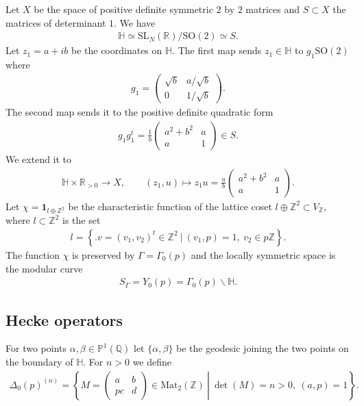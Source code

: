 \documentclass[a4paper,11pt]{amsart} %
\newcommand{\8}{\infty}
\newcommand{\Z}{\mathbb{Z}}
\newcommand{\id}{\mathbf{1}}
\newcommand{\SO}{\mathrm{SO}}
\newcommand{\SL}{\mathrm{SL}}
\newcommand{\HH}{\mathbb{H}}
\newcommand{\R}{\mathbb{R}}
\newcommand{\Q}{\mathbb{Q}}
\newcommand{\PP}{\mathbb{P}}
\newcommand{\Mat}{\mathrm{Mat}}
\theoremstyle{mytheoremstyle}
\theoremstyle{remark}
\numberwithin{equation}{section}
\begin{document}
 Let $X$ be the space of positive definite symmetric $2$ by $2$ matrices and $S \subset X$ the matrices of determinant $1$. We have
 \begin{align}
     \HH \simeq \SL_N(\R)/\SO(2) \simeq S.
 \end{align}
 Let $z_1=a+ib$ be the coordinates on $\HH$. The first map sends $z_1 \in \HH$ to $g_1\SO(2)$ where
 \begin{align}
     g_1=\begin{pmatrix}
         \sqrt{b} & a/\sqrt{b} \\
         0 & 1/\sqrt{b}
     \end{pmatrix}.
 \end{align}
 The second map sends it to the positive definite quadratic form
 \begin{align}
         g_1 g^t_1=\frac{1}{b} \begin{pmatrix}
             a^2+b^2 & a \\ a & 1
         \end{pmatrix} \in S.
 \end{align}
 We extend it to
 \begin{align}
     \HH \times \R_{>0} \longrightarrow X,\qquad
     (z_1 , u) \longmapsto z_1u=\frac{u}{b} \begin{pmatrix}
             a^2+b^2 & a \\ a & 1
         \end{pmatrix}.
 \end{align}
Let $\chi=\id_{l \oplus \Z^2}$ be the characteristic function of the lattice coset $l \oplus \Z^2 \subset V_\Z$, where $l \subset \Z^2$ is the set
\begin{align*}
l=\left \{ \biggl . v=(v_1,v_2)^t \in \Z^2 \  \biggr \vert \ (v_1,p)=1, \ v_2 \in p\Z  \right \}.
\end{align*}
The function $\chi$ is preserved by $\Gamma=\Gamma_0(p)$ and the locally symmetric space is the modular curve
\begin{align}
    S_\Gamma = Y_0(p)=\Gamma_0(p)\backslash \HH.
\end{align}


\subsection{Hecke operators}
For two points $\alpha, \beta \in \PP^1(\Q)$ let $\{\alpha,\beta\}$ be the geodesic joining the two points on the boundary of $\HH$. For $n>0$ we define
\begin{align}
    \Delta_0(p)^{(n)} = \left \{ \left . M=\begin{pmatrix}
       a & b \\ pc & d 
    \end{pmatrix} \in \Mat_2(\Z) \ \right \vert \ \det(M)=n>0, \ (a,p)=1 \right \}.
\end{align}
\end{document}
